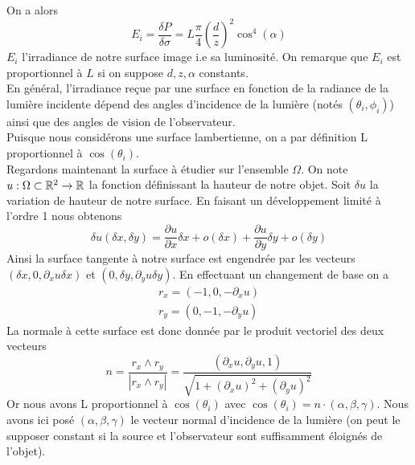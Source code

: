 On a alors 
\begin{equation*}
    E_i= \frac{\delta P}{\delta\sigma}=L\frac{\pi}{4}\left(\frac{d}{z}\right)^2\cos^4 \left( \alpha \right)
\end{equation*}
$E_i$ l'irradiance de notre surface image i.e sa luminosité. On remarque que $E_i$ est proportionnel à $L$ si on suppose $d,z,\alpha$ constants.\\

En général, l’irradiance reçue par une surface en fonction de la radiance de la lumière incidente dépend des angles d’incidence de la lumière (notés $(\theta_i,\phi_i)$) ainsi que des angles de vision de l’observateur. \\


Puisque nous considérons une surface lambertienne, on a par définition
L proportionnel à $\cos(\theta_i)$.\\

Regardons maintenant la surface à étudier sur l'ensemble $\Omega$. On note $u: \Omega \subset \mathbb{R}^2 \rightarrow \mathbb{R}$ la fonction définissant la hauteur de notre objet. Soit $\delta u$ la variation de hauteur de notre surface. En faisant un développement limité à l'ordre 1 nous obtenons 
\begin{equation*}
    \delta u(\delta x, \delta y)=\frac{\partial u}{\partial x}\delta x +o(\delta x)+ \frac{\partial u}{\partial y}\delta y +o(\delta y)
\end{equation*}
Ainsi la surface tangente à notre surface est engendrée par les vecteurs $(\delta x,0,\partial_xu \delta x)$ et $(0,\delta y, \partial_yu \delta y)$. En effectuant un changement de base on a 
\begin{equation*}
    \begin{split}
         r_x=(-1,0,-\partial_xu)\\
         r_y=(0,-1, -\partial_yu)
    \end{split}
\end{equation*}
La normale à cette surface est donc donnée par le produit vectoriel des deux vecteurs
\begin{equation*}
    n=\dfrac{r_x\wedge r_y}{|r_x\wedge r_y|}=\dfrac{(\partial_x u,\partial_yu, 1)}{\sqrt{1+(\partial_x u)^2+(\partial_y u)^2}}
\end{equation*}
Or nous avons L proportionnel à $\cos(\theta_i)$ avec $\cos(\theta_i)=n\cdot (\alpha,\beta,\gamma)$. Nous avons ici posé $(\alpha,\beta,\gamma)$ le vecteur normal d'incidence de la lumière (on peut le supposer constant si la source et l'observateur sont suffisamment éloignés de l'objet).\\

